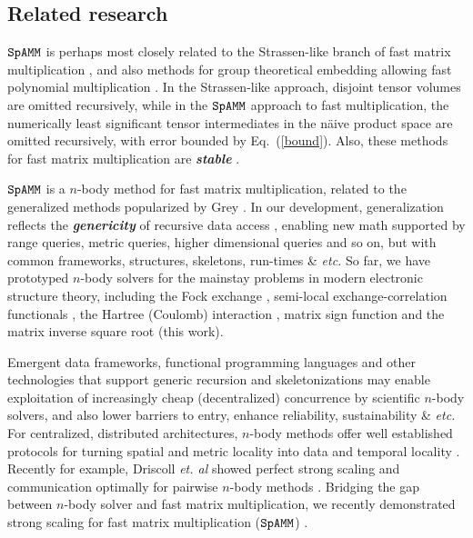 \documentclass[letterpaper,twocolumn,amsmath,amsfont,amssymb,english,aps,jcp,preprintnumbers,groupaddress,nofootinbib,tightenlines,floatfix]{revtex4}
\theoremstyle{plain}
\theoremstyle{remark}
\theoremstyle{plain}
\begin{document}
\subsection{Related research}\label{relatedr} 

$\tt SpAMM$ is perhaps most closely related to the Strassen-like branch of fast matrix multiplication 
\cite{springerlink:10.1007/BF02165411,DDH07,Ballard2014,LeGall:2014:PTF:2608628.2608664,Ambainis15},
and also methods for group theoretical embedding allowing fast polynomial multiplication 
\cite{cohn2003group,cohn2005group,Umans:2006:GAM:1145768.1145772}.
In the Strassen-like approach, disjoint tensor volumes are omitted recursively, 
while in the $\tt SpAMM$ approach to fast multiplication, the numerically least significant 
tensor intermediates in the n\"{a}ive product space are omitted recursively, with error bounded by Eq.~(\ref{bound}).  
Also, these methods for fast matrix multiplication are {\bf \em stable} \cite{DDH07}.

$\tt SpAMM$ is a $n$-body method for fast matrix multiplication, related to the 
generalized methods popularized by Grey \cite{Gray01,Gray2003}. In our development,
generalization reflects the {\bf \em genericity} of recursive data access 
\cite{genericityindata,Geerts2002,Samet:2006:DBDS,Gottschling2009},
enabling new math supported by range queries, metric queries, higher dimensional queries and so on, but with common frameworks, 
structures, skeletons, run-times \& {\em etc.}  
So far, we have prototyped $n$-body solvers for the  mainstay problems in modern electronic structure theory, 
including the Fock exchange \cite{challacombe2014n}, 
semi-local exchange-correlation functionals \cite{Challacombe:2000:HiCu,10.1063/1.1568734}, 
the Hartree (Coulomb) interaction \cite{Challacombe:Review,Challacombe:1996:QCTCb,Challacombe:1997:QCTC,Challacombe:1997:PFMM}, 
matrix sign function \cite{Challacombe2010,BockCK14} 
and the matrix inverse square root (this work).

Emergent data frameworks, functional programming languages and other technologies that support generic recursion and 
skeletonizations \cite{Sarje2010a,Gonzalez-Velez:2010:SAS:1890754.1890757,CPE:CPE3087,rodrigues2014triolet,March} 
may enable exploitation of increasingly cheap (decentralized) concurrence by scientific $n$-body solvers, 
and also lower barriers to entry, enhance reliability, sustainability \& {\em etc.}
For centralized, distributed architectures, $n$-body methods offer well established protocols for turning spatial and metric locality into 
data and temporal locality \cite{Warren:1993:PHO:169627.169640,Warren:1995:HOT,Warren1995266,WarrenGordonBell1997,Warren2013}.  
Recently for example, Driscoll {\em et. al} showed perfect strong scaling and communication optimally 
for pairwise $n$-body methods \cite{Driscoll2013}.   Bridging the gap between 
$n$-body solver and fast matrix multiplication, we recently demonstrated strong scaling for fast matrix multiplication 
($\tt SpAMM$) \cite{BockCK14}.  
\end{document}
